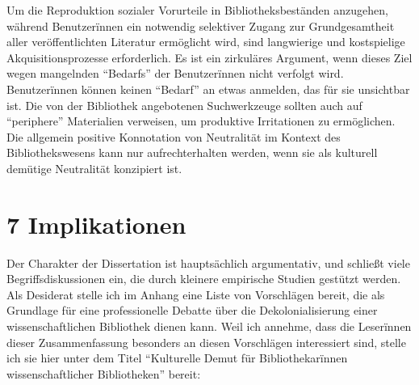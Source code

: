 \documentclass[a4paper,
fontsize=11pt,
oneside,
numbers=noperiodatend,
parskip=half-,
bibliography=totoc,
final
]{scrartcl}
\begin{document}
Um die Reproduktion sozialer Vorurteile in Bibliotheksbeständen
anzugehen, während Benutzerïnnen ein notwendig selektiver Zugang zur
Grundgesamtheit aller veröffentlichten Literatur ermöglicht wird, sind
langwierige und kostspielige Akquisitionsprozesse erforderlich. Es ist
ein zirkuläres Argument, wenn dieses Ziel wegen mangelnden
\enquote{Bedarfs} der Benutzerïnnen nicht verfolgt wird. Benutzerïnnen
können keinen \enquote{Bedarf} an etwas anmelden, das für sie unsichtbar
ist. Die von der Bibliothek angebotenen Suchwerkzeuge sollten auch auf
\enquote{periphere} Materialien verweisen, um produktive Irritationen zu
ermöglichen. Die allgemein positive Konnotation von Neutralität im
Kontext des Bibliothekswesens kann nur aufrechterhalten werden, wenn sie
als kulturell demütige Neutralität konzipiert ist.

\hypertarget{liste}{%
\section{7 Implikationen}\label{liste}}

Der Charakter der Dissertation ist hauptsächlich argumentativ, und
schließt viele Begriffsdiskussionen ein, die durch kleinere empirische
Studien gestützt werden. Als Desiderat stelle ich im Anhang eine Liste
von Vorschlägen bereit, die als Grundlage für eine professionelle
Debatte über die Dekolonialisierung einer wissenschaftlichen Bibliothek
dienen kann. Weil ich annehme, dass die Leserïnnen dieser
Zusammenfassung besonders an diesen Vorschlägen interessiert sind,
stelle ich sie hier unter dem Titel \enquote{Kulturelle Demut für
Bibliothekarïnnen wissenschaftlicher Bibliotheken} bereit:
\end{document}
